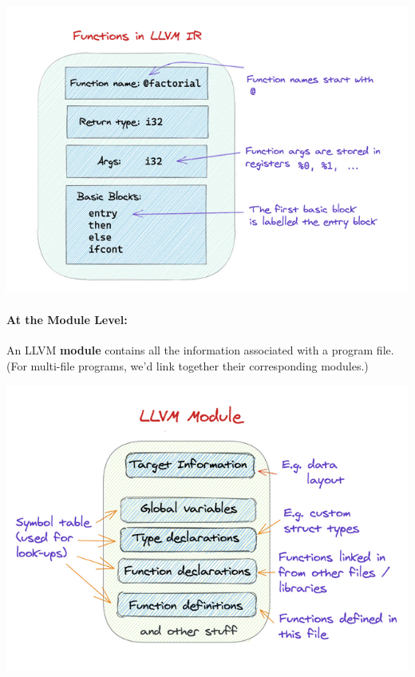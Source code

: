 {
\href{https://mukulrathi.com/static/c80bbba94459a0ac84429c53299823b2/b2b2c/factorial-fn.png}{{}
\includegraphics[width=\linewidth]{08_files/factorial-fn.png}} }

\hypertarget{at-the-module-level}{%
\paragraph{\texorpdfstring{\protect\hyperlink{at-the-module-level}{}At
the Module Level:}{At the Module Level:}}\label{at-the-module-level}}

An LLVM \textbf{module} contains all the information associated with a
program file. (For multi-file programs, we'd link together their
corresponding modules.)

{
\href{https://mukulrathi.com/static/e21edb9623d8fb7bc23f57db23b93cf8/cad61/module.png}{{}
\includegraphics[width=\linewidth]{08_files/module.png}} }

